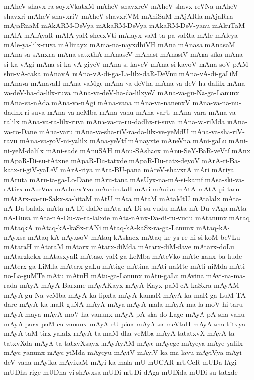 {mAheV-shavx-ra-soyxVkatxM
mAheV-shavxreV
mAheV-shavx-reVNa
mAheV-shavxri
mAheV-shavxriV
mAheV-shavxriVM
mAhiSaM
mAjARla
mAjaRna
mAjaRnaM
mAkARM-DeVya
mAkaRM-DeVya
mAkaRM-DeV-yanu
mAkuTaM
mAlA
mAlAyaR
mAlA-yaR-shecxVti
mAlayx-vaM-ta-pa-vaRta
mAle
mAleya
mAle-ya-lilx-ruva
mAlinayx
mAma-na-nayxdhiVH
mAna
mAnasa
mAnasaM
mAna-sa-sAnxna
mAna-satxthA
mAnaseV
mAnasi
mAnasiV
mAna-sika
mAna-si-ka-vAgi
mAna-si-ka-vA-giyeV
mAna-si-kaveV
mAna-si-kavoV
mAna-soV-pAM-shu-vA-caka
mAnavA
mAna-vA-di-ga-La-lilx-daR-DeVnu
mAna-vA-di-gaLiM
mAnava
mAnavaH
mAna-vaMge
mAna-va-deVha
mAna-va-deV-ha-dalilx
mAna-va-deV-ha-da-lilx-ruva
mAna-va-deV-ha-da-lilxyeV
mAna-va-gu-Na-ga-Lanunx
mAna-va-nAda
mAna-va-nAgi
mAna-vana
mAna-va-nanenxV
mAna-va-na-nu-dadhx-ri-suva
mAna-va-neMba
mAna-vanu
mAna-varU
mAna-vara
mAna-va-ralilx
mAna-va-ra-lilx-ruva
mAna-va-ra-nu-dadhx-ri-suva
mAna-va-riMda
mAna-va-ro-Dane
mAna-varu
mAna-va-sha-riV-ra-da-lilx-ve-yeMdU
mAna-va-sha-riV-ravu
mAna-va-yoV-ni-yalilx
mAna-yeVtf
mAnayxte
mAneVna
mAni-gaLu
mAni-ni-yeM-dalilx
mAni-sade
mAnuSAH
mAnu-SAshacx
mAnu-SeY-BaR-veVtf
mAnx
mApaR-Di-su-tAtxne
mApaR-Du-tatxde
mApaR-Du-tatx-deyoV
mArA-ri-Ba-katx-ri-giV-yaLeV
mArA-riya
mAra-BU-pana
mAreV-shavxrA
mAri
mAriya
mAruta
mAru-ta-ga-Lo-Dane
mAru-tana
mAsUyx-na-mA-si-kamf
mAsa-shi-va-rAtirx
mAseVna
mAshecxYva
mAshirxtaH
mAsi
mAsika
mAtA
mAtA-pi-taru
mAtArx-ca-tu-Sakx-sa-hitaM
mAtU
mAta
mAtaM
mAtaMtU
mAtalalx
mAta-nA-Da-balalx
mAta-nA-Di-daDe
mAta-nA-Di-su-vudu
mAta-nA-Du-vAga
mAta-nA-Duva
mAta-nA-Du-va-ra-lalxde
mAta-nAnx-Da-di-ru-vudu
mAtanunx
mAtaq
mAtaqkA
mAtaq-kA-kaSx-rANi
mAtaq-kA-kaSx-ra-ga-Lanunx
mAtaq-kA-nAyxsa
mAtaq-kA-nAyxsoV
mAtaq-kAshacx
mAtaq-ke-ya-re-ni-si-koM-beVLu
mAtaraH
mAtaraM
mAtarx
mAtarx-diMda
mAtarx-diM-dave
mAtarx-doLu
mAtarxkekx
mAtasxyaR
mAtasx-yaR-ga-LeMba
mAteVko
mAte-nanx-ba-hude
mAterx-ga-LiMda
mAterx-gaLu
mAtige
mAtina
mAti-naMte
mAti-niMda
mAti-no-La-guMTe
mAtu
mAtuH
mAtu-ga-Lanunx
mAtu-gaLu
mAvina
mAvi-na-ma-rada
mAyA
mAyA-Barxme
mAyAKayx
mAyA-Kayx-paM-cA-kaSxra
mAyAM
mAyA-gu-Na-veMba
mAyA-ka-lipxta
mAyA-kamaR
mAyA-ka-maR-ga-LuM-TA-dare
mAyA-ka-maR-guNA
mAyA-mAya
mAyA-mala
mAyA-ma-la-moV-hi-taru
mAyA-maya
mAyA-moV-ha-vanunx
mAyA-pA-sha-do-Lage
mAyA-pA-sha-vanu
mAyA-parx-paM-ca-vanunx
mAyA-rU-pina
mAyA-sa-meVtaH
mAyA-sha-kitxya
mAyA-taM-tirx-yalalx
mAyA-ta-maM-dha-veMba
mAyA-tatatxvX
mAyA-ta-tatxvXda
mAyA-ta-tatxvXsayx
mAyAyAM
mAye
mAyege
mAyeya
mAye-yalilx
mAye-yanunx
mAye-yiMda
mAyeyu
mAyiV
mAyiV-ka-ma-lavu
mAyiVya
mAyi-deV-vana
mAyika
mAyikaM
mAyi-ka-mala
mU
mUCAR
mUCeR
mUDa-lAgi
mUDha-rige
mUDha-vi-shAvxsa
mUDi
mUDi-dAga
mUDida
mUDi-su-tatxde
}
